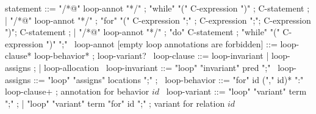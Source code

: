 \begin{syntax}
  statement ::= "/*@" loop-annot "*/" ;
  "while" "(" C-expression ")" ;
  C-statement ;
  | "/*@" loop-annot "*/" ;
  "for" "(" C-expression ";" ;
  C-expression ";";
  C-expression ")";
  C-statement ;
  | "/*@" loop-annot "*/" ;
  "do" C-statement ;
  "while" "(" C-expression ")" ";"
  \
  loop-annot [empty loop annotations are forbidden] ::= loop-clause* loop-behavior* ;
                 loop-variant?
  \
  loop-clause ::= loop-invariant | loop-assigns ;
                | loop-allocation
  \
  loop-invariant ::= "loop" "invariant" pred ";" 
  \
  loop-assigns ::= "loop" "assigns" locations ";" ;
  \
  loop-behavior ::= "for" id ("," id)* ":" loop-clause+ ; annotation for behavior $id$
  \
  loop-variant ::= "loop" "variant" term ";" ;
  | "loop" "variant" term "for" id ";" ; variant for relation $id$
\end{syntax}
